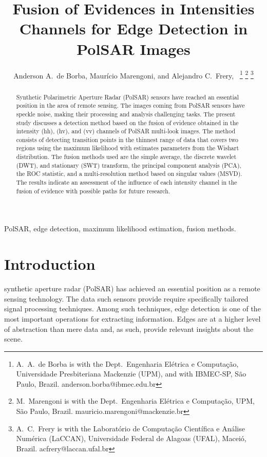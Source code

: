 \documentclass[journal]{IEEEtran}
\begin{document}
\title{Fusion of Evidences in Intensities Channels for Edge Detection in PolSAR Images}
\author{Anderson A.\ de Borba, Maurício Marengoni, and Alejandro C.\ Frery,~%
\thanks{A.\ A.\ de Borba is with the Dept.\ Engenharia Elétrica e Computação, Universidade Presbiteriana Mackenzie (UPM), and with IBMEC-SP, São Paulo, Brazil. anderson.borba@ibmec.edu.br}
\thanks{M.\ Marengoni is with the Dept.\ Engenharia Elétrica e Computação,
UPM, São Paulo, Brazil. mauricio.marengoni@mackenzie.br}
\thanks{A.\ C.\ Frery is with the Laboratório de Computação Científica e Análise Numérica (LaCCAN), Universidade Federal de Alagoas (UFAL), Maceió, Brazil. acfrery@laccan.ufal.br}}

\maketitle

\begin{abstract}
Synthetic Polarimetric Aperture Radar (PolSAR) sensors have reached an essential position in the area of remote sensing. 
The images coming from PolSAR sensors have speckle noise, making their processing and analysis challenging tasks. 
The present study discusses a detection method based on the fusion of evidence obtained in the intensity (hh), (hv), and (vv) channels of PolSAR multi-look images. 
The method consists of detecting transition points in the thinnest range of data that covers two regions using the maximum likelihood with estimates parameters from the Wishart distribution. 
The fusion methods used are the simple average, the discrete wavelet (DWT), and stationary (SWT) transform, the principal component analysis (PCA), the ROC statistic, and a multi-resolution method based on singular values (MSVD). 
The results indicate an assessment of the influence of each intensity channel in the fusion of evidence with possible paths for future research.
\end{abstract}

\begin{IEEEkeywords}
PolSAR, edge detection, maximum likelihood estimation, fusion methods. 
\end{IEEEkeywords}

\section{Introduction}\label{sec_01}
 synthetic aperture radar (PolSAR) has achieved an essential position as a remote sensing technology. 
The data such sensors provide require specifically tailored signal processing techniques.
Among such techniques, edge detection is one of the most important operations for extracting information.
Edges are at a higher level of abstraction than mere data and, as such, provide relevant insights about the scene.
\end{document}
